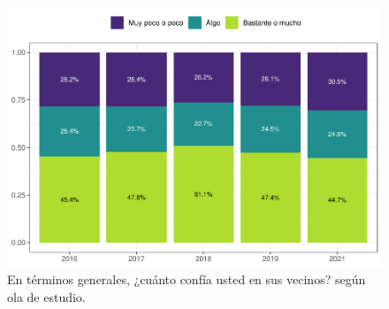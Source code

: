 \documentclass[
  12pt,
]{book}
\begin{document}
\begin{figure}

{\centering \includegraphics{reporte-elsoc_files/figure-latex/vecinos-ola-1} 

}

\caption{En términos generales, ¿cuánto confía usted en sus vecinos? según ola de estudio.}\label{fig:vecinos-ola}
\end{figure}
\end{document}
